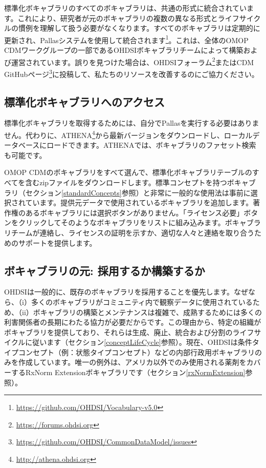 \documentclass[
  11pt]{book}
\theoremstyle{definition}
\theoremstyle{definition}
\theoremstyle{definition}
\theoremstyle{definition}
\theoremstyle{remark}
\begin{document}
標準化ボキャブラリのすべてのボキャブラリは、共通の形式に統合されています。これにより、研究者が元のボキャブラリの複数の異なる形式とライフサイクルの慣例を理解して扱う必要がなくなります。すべてのボキャブラリは定期的に更新され、Pallasシステムを使用して統合されます\footnote{\url{https://github.com/OHDSI/Vocabulary-v5.0}}。これは、全体のOMOP CDMワークグループの一部であるOHDSIボキャブラリチームによって構築および運営されています。誤りを見つけた場合は、OHDSIフォーラム\footnote{\url{https://forums.ohdsi.org}}またはCDM GitHubページ\footnote{\url{https://github.com/OHDSI/CommonDataModel/issues}}に投稿して、私たちのリソースを改善するのにご協力ください。 

\subsection{標準化ボキャブラリへのアクセス}\label{accessVocabularies}

標準化ボキャブラリを取得するためには、自分でPallasを実行する必要はありません。代わりに、ATHENA\footnote{\url{http://athena.ohdsi.org}}から最新バージョンをダウンロードし、ローカルデータベースにロードできます。ATHENAでは、ボキャブラリのファセット検索も可能です。   

OMOP CDMのボキャブラリをすべて選んで、標準化ボキャブラリテーブルのすべてを含むzipファイルをダウンロードします。標準コンセプトを持つボキャブラリ（セクション\ref{standardConcepts}参照）と非常に一般的な使用法は事前に選択されています。提供元データで使用されているボキャブラリを追加します。著作権のあるボキャブラリには選択ボタンがありません。「ライセンス必要」ボタンをクリックしてそのようなボキャブラリをリストに組み込みます。ボキャブラリチームが連絡し、ライセンスの証明を示すか、適切な人々と連絡を取り合うためのサポートを提供します。

\subsection{ボキャブラリの元: 採用するか構築するか}\label{ux30dcux30adux30e3ux30d6ux30e9ux30eaux306eux5143-ux63a1ux7528ux3059ux308bux304bux69cbux7bc9ux3059ux308bux304b}

OHDSIは一般的に、既存のボキャブラリを採用することを優先します。なぜなら、（i）多くのボキャブラリがコミュニティ内で観察データに使用されているため、（ii）ボキャブラリの構築とメンテナンスは複雑で、成熟するためには多くの利害関係者の長期にわたる協力が必要だからです。この理由から、特定の組織がボキャブラリを提供しており、それらは生成、廃止、統合および分割のライフサイクルに従います（セクション\ref{conceptLifeCycle}参照）。現在、OHDSIは条件タイプコンセプト（例：状態タイプコンセプト）などの内部行政用ボキャブラリのみを作成しています。唯一の例外は、アメリカ以外でのみ使用される薬剤をカバーするRxNorm Extensionボキャブラリです（セクション\ref{rxNormExtension}参照）。
\end{document}
